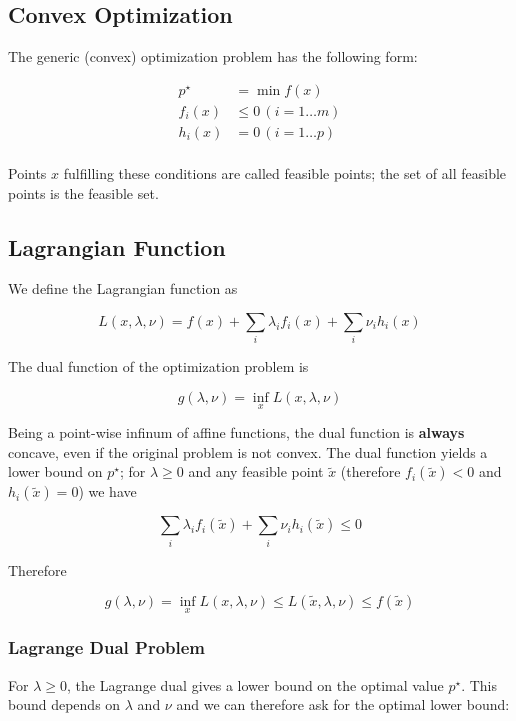 
\subsection{Convex Optimization}

The generic (convex) optimization problem has the following form:


\begin{align*}
p^\star & = \min f(x) \\
f_i(x) & \leq 0 \, (i=1 \ldots m) \\
h_i(x) & = 0 \, (i=1 \ldots p) \\
\end{align*}


Points $x$ fulfilling these conditions are called feasible points; the set of all feasible points is the feasible set.

\subsection{Lagrangian Function}

We define the Lagrangian function as

\[
L(x,\lambda,\nu) = f(x) + \sum_i \lambda_i f_i(x) + \sum_i \nu_i h_i(x)
\]

The dual function of the optimization problem is

\[
g(\lambda, \nu) = \inf_x L(x,\lambda,\nu)
\]

Being a point-wise infinum of affine functions, the dual function is \textbf{always} concave, even if the original problem is not convex. The dual function yields a lower bound on $p^\star$; for $\lambda \geq 0 $ and any feasible point $\tilde x$ (therefore $f_i(\tilde x) < 0$ and $h_i(\tilde x)=0$) we have

\[
\sum_i \lambda_i f_i(\tilde x) + \sum_i \nu_i h_i(\tilde x) \leq 0
\]

Therefore

\[
g(\lambda, \nu) = \inf_x L(x,\lambda,\nu) \leq L(\tilde x, \lambda, \nu) \leq f(\tilde x)
\]

\subsubsection{Lagrange Dual Problem}

For $\lambda \geq 0$, the Lagrange dual gives a lower bound on the optimal value $p^\star$. This bound depends on $\lambda$ and $\nu$ and we can therefore ask for the optimal lower bound:


